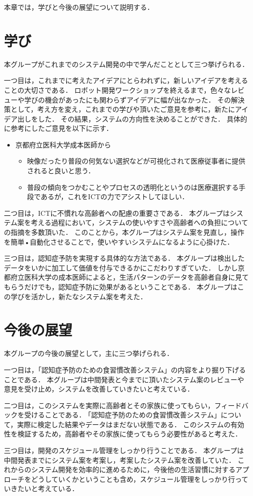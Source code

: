\documentclass[../report]{subfiles}
\begin{document}
本章では，学びと今後の展望について説明する．

\section{学び}
本グループがこれまでのシステム開発の中で学んだこととして三つ挙げられる．

一つ目は，これまでに考えたアイデアにとらわれずに，新しいアイデアを考えることの大切さである．
ロボット開発ワークショップを終えるまで，色々なレビューや学びの機会があったにも関わらずアイデアに幅が出なかった．
その解決策として，考え方を変え，これまでの学びや頂いたご意見を参考に，新たにアイデア出しをした．
その結果，システムの方向性を決めることができた．
具体的に参考にしたご意見を以下に示す．

\begin{itemize}
    \item[] 京都府立医科大学成本医師から
    \begin{itemize}
        \item 映像だったり普段の何気ない選択などが可視化されて医療従事者に提供されると良いと思う．
        \item 普段の傾向をつかむことやプロセスの透明化というのは医療選択する手段であるが，これをICTの力でアシストしてほしい．
    \end{itemize}
\end{itemize}

二つ目は，ICTに不慣れな高齢者への配慮の重要さである．
本グループはシステム案を考える過程において，システムの使いやすさや高齢者への負担についての指摘を多数頂いた．
このことから，本グループはシステム案を見直し，操作を簡単•自動化させることで，使いやすいシステムになるように心掛けた．

三つ目は，認知症予防を実現する具体的な方法である．
本グループは検出したデータをいかに加工して価値を付与できるかにこだわりすぎていた．
しかし京都府立医科大学の成本医師によると，生活パターンのデータを高齢者自身に見てもらうだけでも，認知症予防に効果があるということである．
本グループはこの学びを活かし，新たなシステム案を考えた．


\section{今後の展望}
本グループの今後の展望として，主に三つ挙げられる．

一つ目は，｢認知症予防のための食習慣改善システム」の内容をより掘り下げることである．
本グループは中間発表と今までに頂いたシステム案のレビューや意見を受け止め，システムを改善していきたいと考えている．

二つ目は，このシステムを実際に高齢者とその家族に使ってもらい，フィードバックを受けることである．
｢認知症予防のための食習慣改善システム」について，実際に検定した結果やデータはまだない状態である．
このシステムの有効性を検証するため，高齢者やその家族に使ってもらう必要性があると考えた．

三つ目は，開発のスケジュール管理をしっかり行うことである．
本グループは中間発表までにシステム案を考案し，考案したシステム案を改善していた．
これからのシステム開発を効率的に進めるために，今後他の生活習慣に対するアプローチをどうしていくかということも含め，スケジュール管理をしっかり行っていきたいと考えている．
\end{document}
